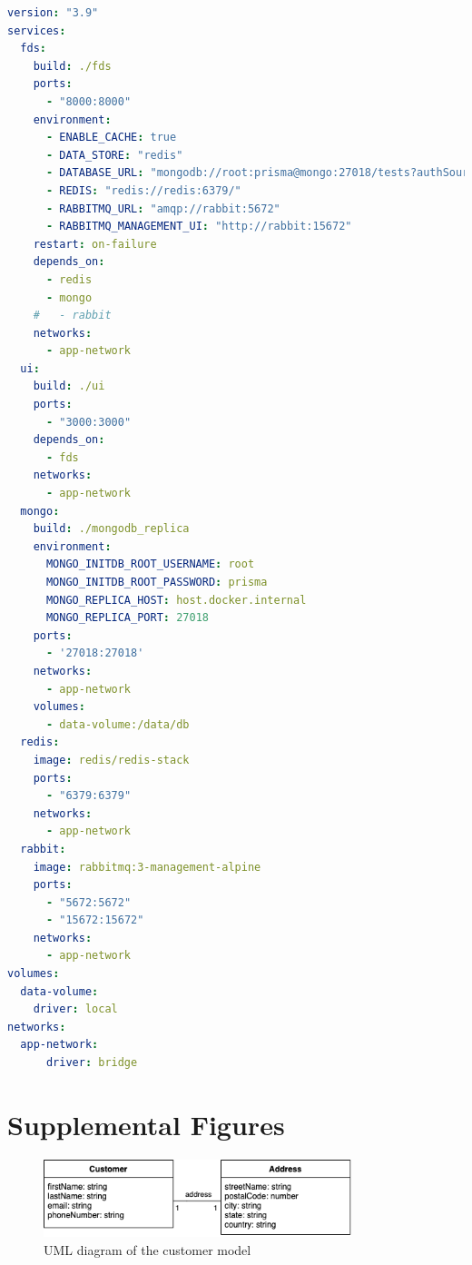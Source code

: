   \newpage
  \begin{lstlisting}[caption={Docker Compose usage (YAML)}, label={code:compose}, language=yaml]
version: "3.9"
services:
  fds:
    build: ./fds
    ports:
      - "8000:8000"
    environment:
      - ENABLE_CACHE: true
      - DATA_STORE: "redis"
      - DATABASE_URL: "mongodb://root:prisma@mongo:27018/tests?authSource=admin/"
      - REDIS: "redis://redis:6379/"
      - RABBITMQ_URL: "amqp://rabbit:5672"
      - RABBITMQ_MANAGEMENT_UI: "http://rabbit:15672"
    restart: on-failure
    depends_on:
      - redis
      - mongo
    #   - rabbit
    networks:
      - app-network
  ui:
    build: ./ui
    ports: 
      - "3000:3000"
    depends_on: 
      - fds
    networks:
      - app-network  
  mongo:
    build: ./mongodb_replica
    environment:
      MONGO_INITDB_ROOT_USERNAME: root
      MONGO_INITDB_ROOT_PASSWORD: prisma
      MONGO_REPLICA_HOST: host.docker.internal
      MONGO_REPLICA_PORT: 27018
    ports:
      - '27018:27018'
    networks:
      - app-network
    volumes:
      - data-volume:/data/db
  redis:
    image: redis/redis-stack
    ports:
      - "6379:6379"
    networks: 
      - app-network
  rabbit:
    image: rabbitmq:3-management-alpine
    ports:
      - "5672:5672"
      - "15672:15672"
    networks:
      - app-network
volumes:
  data-volume:
    driver: local
networks:
  app-network:
      driver: bridge
  \end{lstlisting}

  \newpage
  \section{Supplemental Figures}

  \begin{figure}[!ht]
    \centering
    \includegraphics[width=0.8\textwidth]{diagrams/entity-customer.png}
    \caption{UML diagram of the customer model}
   \label{fig:customer_uml}
  \end{figure}
  
